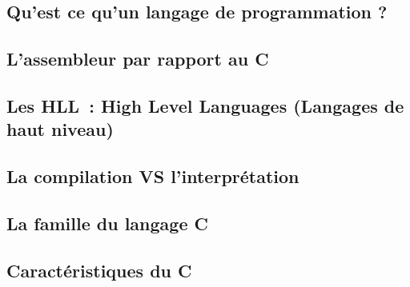 \subsection*{Qu'est ce qu'un langage de programmation ?}



\subsection*{L'assembleur par rapport au C}









\subsection*{Les HLL~: High Level Languages (Langages de haut niveau)}



\subsection*{La compilation VS l'interprétation}







\subsection*{La famille du langage C}





\subsection*{Caractéristiques du C}


